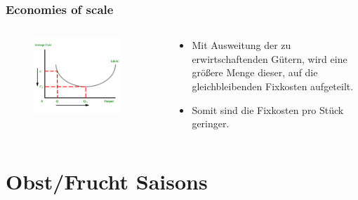 \documentclass{beamer}
\begin{document}
\begin{frame}
\frametitle{Economies of scale}

\begin{columns}
    \begin{column}{0.5\textwidth}
  \begin{figure}[h]
    \centering
      \includegraphics[width=0.9\textwidth]{economies_of_scale}
  \end{figure}
    \end{column}
    \begin{column}{0.5\textwidth}
    \begin{itemize}
    \item
  Mit Ausweitung der zu
  erwirtschaftenden Gütern,
  wird eine größere Menge
  dieser, auf die
  gleichbleibenden Fixkosten
  aufgeteilt.
\item
  Somit sind die Fixkosten pro
  Stück geringer.

    \end{itemize}
    \end{column}

\end{columns}
\end{frame}

\section{Obst/Frucht Saisons}
\end{document}
